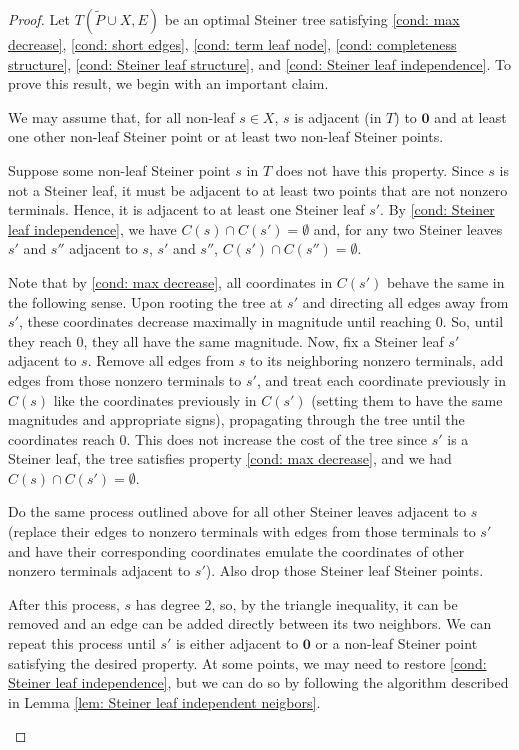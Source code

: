 \documentclass{theoretics}
\newcommand{\1}{\textbf{1}}
\renewcommand{\tilde}{\widetilde}
\begin{document}
\begin{proof}
Let $T(\tilde{P} \cup X, E)$ be an optimal Steiner tree satisfying \ref{cond: max decrease}, \ref{cond: short edges}, \ref{cond: term leaf node}, \ref{cond: completeness structure}, \ref{cond: Steiner leaf structure}, and \ref{cond: Steiner leaf independence}. To prove this result, we begin with an important claim.
\begin{claim}
We may assume that, for all non-leaf $s \in X$, $s$ is adjacent (in $T$) to $\mathbf{0}$ and at least one other non-leaf Steiner point or at least two non-leaf Steiner points.
\end{claim}
\begin{subproof}
Suppose some non-leaf Steiner point $s$ in $T$ does not have this property. Since $s$ is not a Steiner leaf, it must be adjacent to at least two points that are not nonzero terminals. Hence, it is adjacent to at least one Steiner leaf $s'$. By \ref{cond: Steiner leaf independence}, we have $C(s) \cap C(s') = \emptyset$ and, for any two Steiner leaves $s'$ and $s''$ adjacent to $s$,  $s'$ and $s''$, $C(s') \cap C(s'') = \emptyset$. 

Note that by \ref{cond: max decrease}, all coordinates in $C(s')$ behave the same in the following sense. Upon rooting the tree at $s'$ and directing all edges away from $s'$, these coordinates decrease maximally in magnitude until reaching $0$. So, until they reach $0$, they all have the same magnitude. Now, fix a Steiner leaf $s'$ adjacent to $s$. Remove all edges from $s$ to its neighboring nonzero terminals, add edges from those nonzero terminals to $s'$, and treat each coordinate previously in $C(s)$ like the coordinates previously in $C(s')$ (setting them to have the same magnitudes and appropriate signs), propagating through the tree until the coordinates reach $0$. This does not increase the cost of the tree since $s'$ is a Steiner leaf, the tree satisfies property \ref{cond: max decrease}, and we had $C(s) \cap C(s') = \emptyset$.

Do the same process outlined above for all other Steiner leaves adjacent to $s$ (replace their edges to nonzero terminals with edges from those terminals to $s'$ and have their corresponding coordinates emulate the coordinates of other nonzero terminals adjacent to $s'$). Also drop those Steiner leaf Steiner points.

After this process, $s$ has degree $2$, so, by the triangle inequality, it can be removed and an edge can be added directly between its two neighbors. We can repeat this process until $s'$ is either adjacent to $\mathbf{0}$ or a non-leaf Steiner point satisfying the desired property. At some points, we may need to restore \ref{cond: Steiner leaf independence}, but we can do so by following the algorithm described in Lemma \ref{lem: Steiner leaf independent neigbors}.


\end{subproof}
\end{proof}
\end{document}
